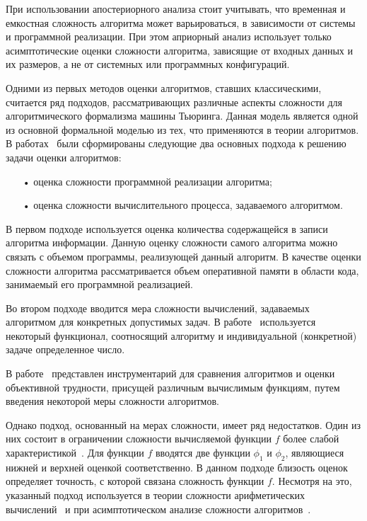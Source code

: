 \documentclass[a4paper, article, 14pt]{extarticle}
\begin{document}
При использовании апостериорного анализа стоит учитывать, что временная и емкостная сложность алгоритма может варьироваться, в зависимости от системы и программной реализации. При этом априорный анализ использует только асимптотические оценки сложности алгоритма, зависящие от входных данных и их размеров, а не от системных или программных конфигураций.

Одними из первых методов оценки алгоритмов, ставших классическими, считается ряд подходов, рассматривающих различные аспекты сложности для алгоритмического формализма машины Тьюринга. Данная модель является одной из основной формальной моделью из тех, что применяются в теории алгоритмов. В работах~\cite{trachtenbort_common, ofman} были сформированы следующие два основных подхода к решению задачи оценки алгоритмов:

\begin{enumerate}
	\item[•] оценка сложности программной реализации алгоритма;

	\item[•] оценка сложности вычислительного процесса, задаваемого алгоритмом.
\end{enumerate}

В первом подходе используется оценка количества содержащейся в записи алгоритма информации. Данную оценку сложности самого алгоритма можно связать с объемом программы, реализующей данный алгоритм. В качестве оценки сложности алгоритма рассматривается объем оперативной памяти в области кода, занимаемый его программной реализацией.

Во втором подходе вводится мера сложности вычислений, задаваемых алгоритмом для конкретных допустимых задач. В работе~\cite{caytin} используется некоторый функционал, соотносящий алгоритму и индивидуальной (конкретной) задаче определенное число.

В работе~\cite{trachtenbort_recursion} представлен инструментарий для сравнения алгоритмов и оценки объективной трудности, присущей различным вычислимым функциям, путем введения некоторой меры сложности алгоритмов.

Однако подход, основанный на мерах сложности, имеет ряд недостатков. Один из них состоит в ограничении сложности вычисляемой функции $f$ более слабой характеристикой~\cite{alpherova}. Для функции $f$ вводятся две функции $\phi_1$ и $\phi_2$, являющиеся нижней и верхней оценкой соответственно. В данном подходе близость оценок определяет точность, с которой связана сложность функции $f$. Несмотря на это, указанный подход используется в теории сложности арифметических вычислений~\cite{gashkov} и при асимптотическом анализе сложности алгоритмов~\cite{cormen}.
\end{document}
